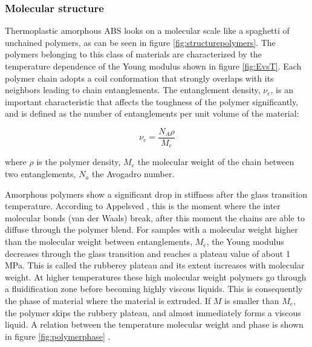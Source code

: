 \subsubsection{Molecular structure}
    Thermoplastic amorphous ABS looks on a molecular scale like a spaghetti of unchained polymers, as can be seen in figure  \ref{fig:structurepolymers}. The polymers belonging to this class of materials are characterized by the temperature dependence of the Young modulus shown in figure \ref{fig:EvsT}. Each polymer chain adopts a coil conformation that strongly overlaps with its neighbors leading to chain entanglements. The entanglement density, $\nu_e$, is an important characteristic that affects the toughness of the polymer significantly, and is defined as the number of entanglements per unit volume of the material:

\begin{equation} \label{eqn:Me}
\nu_e=\frac{N_A\rho}{M_e}
\end{equation}

where $\rho$ is the polymer density, $M_e$ the molecular weight of the chain between two entanglements, $N_a$ the Avogadro number\cite{Halary2011PolymerMaterials}. 

Amorphous polymers show a significant drop in stiffness after the glass transition temperature. According to Appelsved \cite{Appelsved2012InvestigationModels}, this is the moment where the inter molecular bonds (van der Waals) break, after this moment the chains are able to diffuse through the polymer blend. 
For samples with a molecular weight higher than the molecular weight between entanglements, $M_e$, the Young modulus decreases through the glass transition and reaches a plateau value of about 1 MPa. This is called the rubberey plateau and its extent increases with molecular weight. At higher temperatures these high molecular weight polymers go through a fluidification zone before becoming highly viscous liquids. This is consequently the phase of material where the material is extruded. If  $M$ is smaller than $M_e$, the polymer skips the rubbery plateau, and almost immediately forms a viscous liquid. A relation between the temperature molecular weight and phase is shown in figure \ref{fig:polymerphase} \cite{Halary2011PolymerMaterials}.

